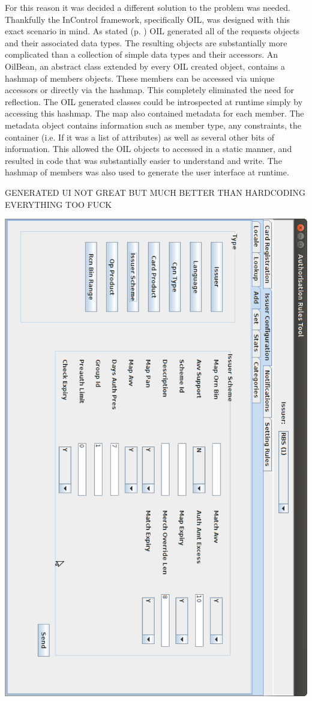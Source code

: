 \documentclass[a4paper, 11pt, titlepage]{article}
\begin{document}
For this reason it was decided a different solution to the problem was needed. Thankfully the InControl framework, specifically OIL, was designed with this exact scenario in mind. As stated (p. \pageref{OILIntro}) OIL generated all of the requests objects and their associated data types. The resulting objects are substantially more complicated than a collection of simple data types and their accessors. An OilBean, an abstract class extended by every OIL created object, contains a hashmap of members objects. These members can be accessed via unique accessors or directly via the hashmap. This completely eliminated the need for reflection. The OIL generated classes could be introspected at runtime simply by accessing this hashmap. The map also contained metadata for each member. The metadata object contains information such as member type, any constraints, the container (i.e. If it was a list of attributes) as well as several other bits of information. This allowed the OIL objects to accessed in a static manner, and resulted in code that was substantially easier to understand and write.
The hashmap of members was also used to generate the user interface at runtime. 

GENERATED UI NOT GREAT BUT MUCH BETTER THAN HARDCODING EVERYTHING TOO FUCK


\includegraphics[width=\textwidth]{smart_generated_ui.png}
\end{document}
